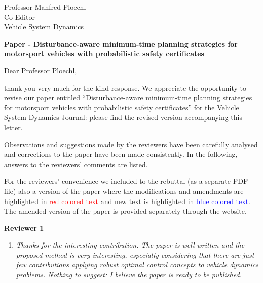 \documentclass{letter}
\begin{document}

\begin{letter}{Professor Manfred Ploechl\\
Co-Editor\\
Vehicle System Dynamics} %


\textbf{Paper - Disturbance-aware minimum-time planning strategies for motorsport vehicles with probabilistic safety certificates}

\opening{Dear Professor Ploechl,}

thank you very much for the kind response. We appreciate the opportunity to revise our paper entitled ``Disturbance-aware minimum-time planning strategies for motorsport vehicles with probabilistic safety certificates'' for the Vehicle System Dynamics Journal: please find the revised version accompanying this letter.

Observations and suggestions made by the reviewers have been carefully analysed and corrections to the paper have been made consistently. In the following, answers to the reviewers' comments are listed.

For the reviewers' convenience we included to the rebuttal (as a separate PDF file) also a version of the paper where the modifications and amendments are highlighted in \textcolor{red}{red colored text} and new text is highlighted in \textcolor{blue}{blue colored text}.
The amended version of the paper is provided separately through the website.

\textbf{Reviewer 1}

\begin{enumerate}

\item
\textit{Thanks for the interesting contribution.
The paper is well written and the proposed method is very interesting, especially considering that there are just few contributions applying robust optimal control concepts to vehicle dynamics problems.
Nothing to suggest: I believe the paper is ready to be published.}


\end{enumerate}
\end{letter}
\end{document}
